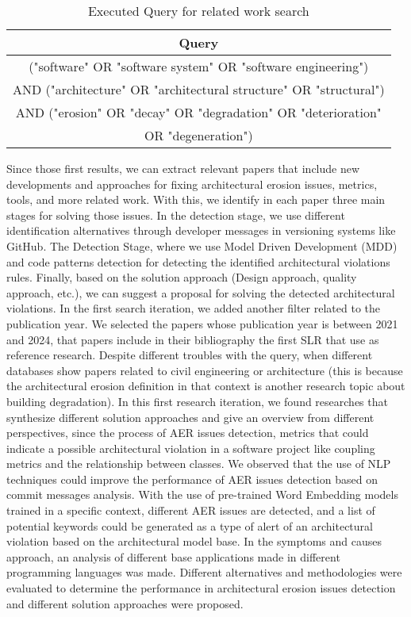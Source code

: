 \begin{table}[H]
    \centering
    \begin{tabular}{|c|}
        \hline
        Query\\
         \hline
             ("software" OR "software system" OR "software engineering") \\
             AND ("architecture" OR "architectural structure" OR "structural") \\
             AND ("erosion" OR "decay" OR "degradation" OR "deterioration"\\
             OR "degeneration") \\
         \hline
    \end{tabular}
    \caption{Executed Query for related work search}
    \label{tab:my_label}
\end{table}

Since those first results, we can extract relevant papers that include new developments and approaches for fixing architectural erosion issues, metrics, tools, and more related work. With this, we identify in each paper three main stages for solving those issues. In the detection stage, we use different identification alternatives through developer messages in versioning systems like GitHub. The Detection Stage, where we use Model Driven Development (MDD) and code patterns detection for detecting the identified architectural violations rules. Finally, based on the solution approach (Design approach, quality approach, etc.), we can suggest a proposal for solving the detected architectural violations.
In the first search iteration, we added another filter related to the publication year. We selected the papers whose publication year is between 2021 and 2024, that papers include in their bibliography the first SLR that use as reference research. Despite different troubles with the query, when different databases show papers related to civil engineering or architecture (this is because the architectural erosion definition in that context is another research topic about building degradation). In this first research iteration, we found researches that synthesize different solution approaches and give an overview from different perspectives, since the process of AER issues detection, metrics that could indicate a possible architectural violation in a software project like coupling metrics and the relationship between classes.
We observed that the use of NLP techniques could improve the performance of AER issues detection based on commit messages analysis. With the use of pre-trained Word Embedding models trained in a specific context, different AER issues are detected, and a list of potential keywords could be generated as a type of alert of an architectural violation based on the architectural model base.
In the symptoms and causes approach, an analysis of different base applications made in different programming languages was made. Different alternatives and methodologies were evaluated to determine the performance in architectural erosion issues detection and different solution approaches were proposed.

